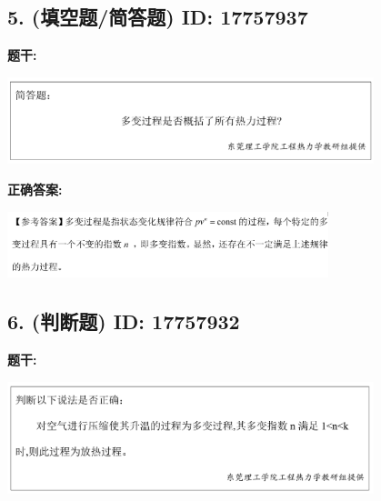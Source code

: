 \documentclass[12pt]{article}
\begin{document}
\vspace{0.5em}\hrulefill\vspace{1em}

\subsection*{5. (填空题/简答题) \small ID: 17757937}

\textbf{题干:}


\begin{center}\includegraphics[width=0.8\textwidth, height=0.25\textheight, keepaspectratio]{question_5_17757937/title_img_1.png}\end{center}

\textbf{正确答案:}

\begin{center}\includegraphics[width=0.7\textwidth, height=0.2\textheight, keepaspectratio]{question_5_17757937/correct_answer_1_img_1.png}\end{center}

\vspace{0.5em}\hrulefill\vspace{1em}

\subsection*{6. (判断题) \small ID: 17757932}

\textbf{题干:}


\begin{center}\includegraphics[width=0.8\textwidth, height=0.25\textheight, keepaspectratio]{question_6_17757932/title_img_1.png}\end{center}
\end{document}
